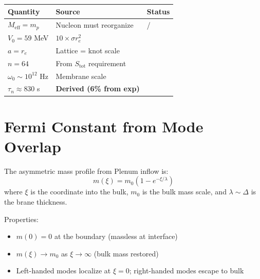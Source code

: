 \begin{remark}
\begin{center}
\begin{tabular}{lll}
\toprule
\textbf{Quantity} & \textbf{Source} & \textbf{Status} \\
\midrule
$M_{\text{eff}} = m_p$ & Nucleon must reorganize & \tagP{}/\tagBL{} \\
$V_0 = 59$ MeV & $10 \times \sigma r_e^2$ & \tagDc{} \\
$a = r_e$ & Lattice = knot scale & \tagP{} \\
$n = 64$ & From $S_{\text{tot}}$ requirement & \tagDc{} \\
$\omega_0 \sim 10^{12}$ Hz & Membrane scale & \tagP{} \\
\midrule
$\tau_n \approx 830$ s & \textbf{Derived (6\% from exp)} & \tagDc{} \\
\bottomrule
\end{tabular}
\end{center}
\end{remark}

\section{Fermi Constant from Mode Overlap}
\label{sec:ch3_fermi}

\begin{definition}
\tagDc{}
The asymmetric mass profile from Plenum inflow is:
\begin{equation}
m(\xi) = m_0 \left(1 - e^{-\xi/\lambda}\right)
\end{equation}
where $\xi$ is the coordinate into the bulk, $m_0$ is the bulk mass scale,
and $\lambda \sim \Delta$ is the brane thickness.

Properties:
\begin{itemize}
  \item $m(0) = 0$ at the boundary (massless at interface)
  \item $m(\xi) \to m_0$ as $\xi \to \infty$ (bulk mass restored)
  \item Left-handed modes localize at $\xi = 0$; right-handed modes escape to bulk
\end{itemize}
\end{definition}

